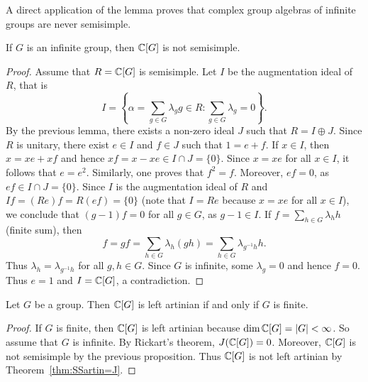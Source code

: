 A direct application of the lemma proves that
complex group algebras of infinite groups are never semisimple. 

\begin{proposition}
    \label{pro:KGsemisimple}
    If $G$ is an infinite group, then $\mathbb{C}[G]$ is not semisimple. 
\end{proposition}

\begin{proof}
	Assume that $R=\mathbb{C}[G]$ is semisimple.  Let $I$ 
	be the augmentation ideal of $R$, that is
	\[
	I=\left\{\alpha=\sum_{g\in G}\lambda_gg\in R:\sum_{g\in G}\lambda_g=0\right\}.
	\]
	By the previous lemma, 
	there exists a non-zero ideal $J$ such that 
	$R=I\oplus J$. Since $R$ is unitary, there exist $e\in I$ and $f\in J$ such that
	$1=e+f$. If
	$x\in I$, then $x=xe+xf$ and hence $xf=x-xe\in I\cap J=\{0\}$. Since 
	$x=xe$ for all $x\in I$, it follows that $e=e^2$. Similarly, one proves
	that $f^2=f$. Moreover, $ef=0$, as $ef\in I\cap J=\{0\}$.  Since $I$ 
	is the augmentation ideal of $R$ and $If=(Re)f=R(ef)=\{0\}$ (note that $I=Re$ because $x=xe$ for all $x\in I$), we conclude that
	$(g-1)f=0$
	for all $g\in G$, as $g-1\in I$. If $f=\sum_{h\in
	G}\lambda_hh$ (finite sum), then  
	\[
	f=gf=\sum_{h\in G}\lambda_h(gh)=\sum_{h\in
	G}\lambda_{g^{-1}h}h.
	\]
	Thus $\lambda_h=\lambda_{g^{-1}h}$ for all $g,h\in G$. Since $G$ 
	is infinite, some $\lambda_g=0$ and hence $f=0$. Thus $e=1$ and $I=\mathbb{C}[G]$, a contradiction. 
\end{proof}


\begin{theorem}
	Let $G$ be a group. Then $\mathbb{C}[G]$ 
	is left artinian if and only if 
	$G$ is finite. 
\end{theorem}

\begin{proof}
    If $G$ is finite, then $\mathbb{C}[G]$ is left artinian because $\dim\mathbb{C}[G]=|G|<\infty$. So assume that 
    $G$ is infinite. By Rickart's theorem,   
	$J(\mathbb{C}[G])=0$. Moreover, $\mathbb{C}[G]$
	is not semisimple by the previous proposition. Thus
	$\mathbb{C}[G]$ is not left artinian by Theorem~\ref{thm:SSartin=J}.
\end{proof}


